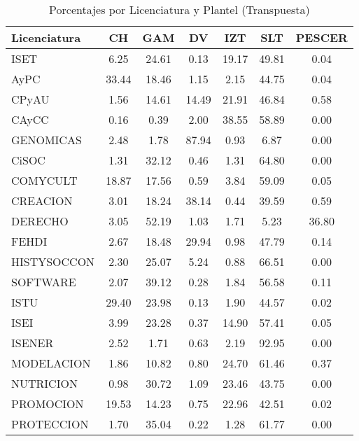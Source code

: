 \documentclass[12pt]{article}
\begin{document}
\begin{table}[ht]
\centering
\caption{Porcentajes por Licenciatura y Plantel (Transpuesta)}
\label{tab:porcentajes_transpuesta}
\begin{tabular}{|l|c|c|c|c|c|c|}
\hline
Licenciatura & CH & GAM & DV & IZT & SLT & PESCER \\ \hline
ISET & 6.25 & 24.61 & 0.13 & 19.17 & 49.81 & 0.04 \\
AyPC & 33.44 & 18.46 & 1.15 & 2.15 & 44.75 & 0.04 \\
CPyAU & 1.56 & 14.61 & 14.49 & 21.91 & 46.84 & 0.58 \\
CAyCC & 0.16 & 0.39 & 2.00 & 38.55 & 58.89 & 0.00 \\
GENOMICAS & 2.48 & 1.78 & 87.94 & 0.93 & 6.87 & 0.00 \\
CiSOC & 1.31 & 32.12 & 0.46 & 1.31 & 64.80 & 0.00 \\
COMYCULT & 18.87 & 17.56 & 0.59 & 3.84 & 59.09 & 0.05 \\
CREACION & 3.01 & 18.24 & 38.14 & 0.44 & 39.59 & 0.59 \\
DERECHO & 3.05 & 52.19 & 1.03 & 1.71 & 5.23 & 36.80 \\
FEHDI & 2.67 & 18.48 & 29.94 & 0.98 & 47.79 & 0.14 \\
HISTYSOCCON & 2.30 & 25.07 & 5.24 & 0.88 & 66.51 & 0.00 \\
SOFTWARE & 2.07 & 39.12 & 0.28 & 1.84 & 56.58 & 0.11 \\
ISTU & 29.40 & 23.98 & 0.13 & 1.90 & 44.57 & 0.02 \\
ISEI & 3.99 & 23.28 & 0.37 & 14.90 & 57.41 & 0.05 \\
ISENER & 2.52 & 1.71 & 0.63 & 2.19 & 92.95 & 0.00 \\
MODELACION & 1.86 & 10.82 & 0.80 & 24.70 & 61.46 & 0.37 \\
NUTRICION & 0.98 & 30.72 & 1.09 & 23.46 & 43.75 & 0.00 \\
PROMOCION & 19.53 & 14.23 & 0.75 & 22.96 & 42.51 & 0.02 \\
PROTECCION & 1.70 & 35.04 & 0.22 & 1.28 & 61.77 & 0.00 \\
\hline
\end{tabular}
\end{table}
\end{document}
